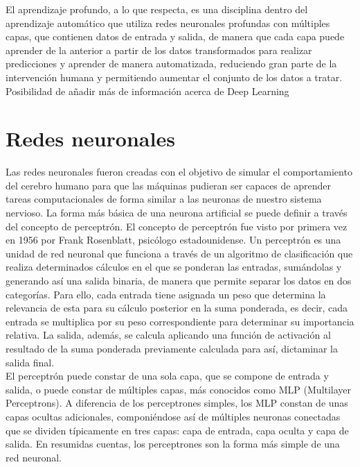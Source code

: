 El aprendizaje profundo, a lo que respecta, es una disciplina dentro del aprendizaje automático que utiliza redes neuronales profundas con múltiples capas, que contienen datos de entrada y salida, de manera que cada capa puede aprender de la anterior a partir de los datos transformados para realizar predicciones y aprender de manera automatizada, reduciendo gran parte de la intervención humana y permitiendo aumentar el conjunto de los datos a tratar.\\
Posibilidad de añadir más de información acerca de Deep Learning\\

\section{Redes neuronales}

Las redes neuronales fueron creadas con el objetivo de simular el comportamiento del cerebro humano para que las máquinas pudieran ser capaces de aprender tareas computacionales de forma similar a las neuronas de nuestro sistema nervioso. La forma más básica de una neurona artificial se puede definir a través del concepto de perceptrón. El concepto de perceptrón fue visto por primera vez en 1956 por Frank Rosenblatt, psicólogo estadounidense. Un perceptrón es una unidad de red neuronal que funciona a través de un algoritmo de clasificación que realiza determinados cálculos en el que se ponderan las entradas, sumándolas y generando así una salida binaria, de manera que permite separar los datos en dos categorías. Para ello, cada entrada tiene asignada un peso que determina la relevancia de esta para su cálculo posterior en la suma ponderada, es decir, cada entrada se multiplica por su peso correspondiente para determinar su importancia relativa. La salida, además, se calcula aplicando una función de activación al resultado de la suma ponderada previamente calculada para así, dictaminar la salida final.\\

El perceptrón puede constar de una sola capa, que se compone de entrada y salida, o puede constar de múltiples capas, más conocidos como MLP (Multilayer Perceptrons). A diferencia de los perceptrones simples, los MLP constan de unas capas ocultas adicionales, componiéndose así de múltiples neuronas conectadas que se dividen típicamente en tres capas: capa de entrada, capa oculta y capa de salida. En resumidas cuentas, los perceptrones son la forma más simple de una red neuronal.\\


